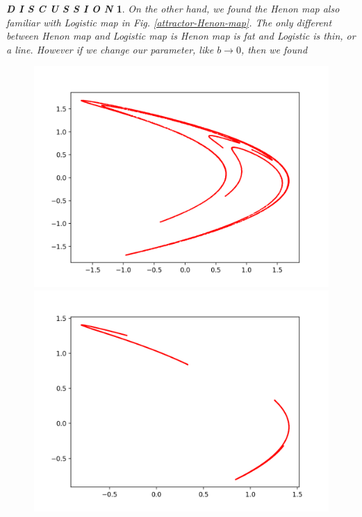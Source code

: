 \documentclass[12pt]{article}
\theoremstyle{plain}
\newtheorem{discussion}{\textit{D I S C U S S I O N}}[section]
\begin{document}
\begin{discussion}
On the other hand, we found the Henon map also familiar with Logistic map in Fig. \ref{attractor-Henon-map}. The only different between Henon map and Logistic map is Henon map is fat and Logistic is thin, or a line. However if we change our parameter, like $b \rightarrow 0$, then we found \\[4ex]


\begin{figure}[H]
\begin{minipage}[c][0.32\width]{0.32\textwidth}
   \centering
   \includegraphics[width=\textwidth]{figure/section2/Henon-attractor-1*2-0*4.png}
\end{minipage}
\begin{minipage}[c][0.32\width]{0.32\textwidth}
   \centering
   \includegraphics[width=\textwidth]{figure/section2/Henon-attractor-1*2-0*2.png}

\end{minipage}
\end{figure}
\end{discussion}
\end{document}
